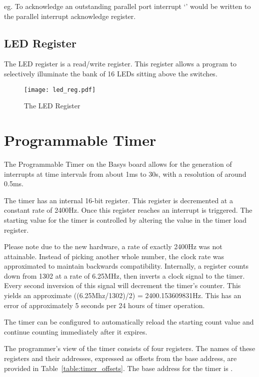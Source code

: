 eg. To acknowledge an outstanding parallel port interrupt `'
would be written to the parallel interrupt acknowledge register.

\subsection{LED Register}

The LED register is a read/write register. This
register allows a program to selectively illuminate the bank of 16 LEDs
sitting above the switches.

\begin{figure}[h]
\begin{center}
\texttt{[image: led\_reg.pdf]}
\caption{The LED Register}
\label{LED_pic}
\end{center}
\end{figure}

\section{Programmable Timer}

The Programmable Timer on the Basys board allows for the generation of
interrupts at time intervals from about 1ms to 30s, with a resolution
of around 0.5ms.

The timer has an internal 16-bit register. This register is decremented
at a constant rate of 2400Hz. Once this register reaches
 an interrupt is triggered. The starting value for the
timer is controlled by altering the value in the timer load register.

Please note due to the new hardware, a rate of exactly 2400Hz was not attainable.
Instead of picking another whole number, the clock rate was approximated
to maintain backwards compatibility. Internally, a register counts down from 1302 
at a rate of 6.25MHz, then inverts a clock signal to the timer.
Every second inversion of this signal will decrement the timer's counter.
This yields an approximate ((6.25Mhz/1302)/2) = 2400.153609831Hz.
This has an error of approximately 5 seconds per 24 hours of timer operation.

The timer can be configured to automatically reload the starting count
value and continue counting immediately after it expires.

The programmer's view of the timer consists of four registers.  The
names of these registers and their addresses, expressed as offsets
from the base address, are provided in
Table~\ref{table:timer_offsets}.  The base address for the timer is
\src{\LOCTIMEBASE}.

